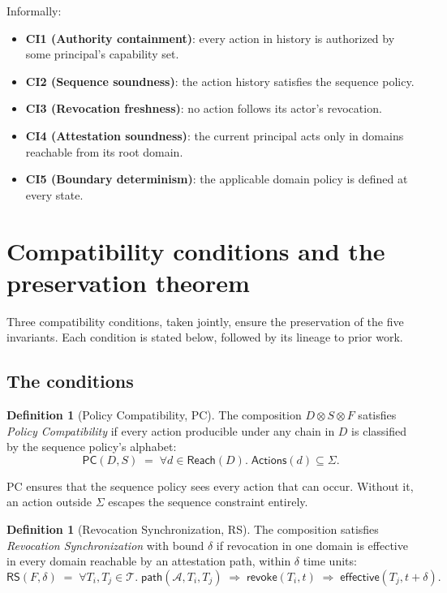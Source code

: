 \documentclass[11pt,a4paper]{article}
\theoremstyle{plain}
\theoremstyle{definition}
\newtheorem{definition}[theorem]{Definition}
\theoremstyle{remark}
\begin{document}
Informally:
\begin{itemize}
  \item \textbf{CI1 (Authority containment)}: every action in history is
  authorized by some principal's capability set.
  \item \textbf{CI2 (Sequence soundness)}: the action history satisfies the
  sequence policy.
  \item \textbf{CI3 (Revocation freshness)}: no action follows its actor's
  revocation.
  \item \textbf{CI4 (Attestation soundness)}: the current principal acts only
  in domains reachable from its root domain.
  \item \textbf{CI5 (Boundary determinism)}: the applicable domain policy is
  defined at every state.
\end{itemize}

\section{Compatibility conditions and the preservation theorem}
\label{sec:conditions}

Three compatibility conditions, taken jointly, ensure the preservation of the
five invariants. Each condition is stated below, followed by its lineage to
prior work.

\subsection{The conditions}

\begin{definition}[Policy Compatibility, PC]
\label{def:pc}
The composition $D \otimes S \otimes F$ satisfies \emph{Policy Compatibility}
if every action producible under any chain in $D$ is classified by the
sequence policy's alphabet:
\begin{equation*}
\mathsf{PC}(D, S) \;=\; \forall d \in \mathsf{Reach}(D).\; \mathsf{Actions}(d) \subseteq \Sigma.
\end{equation*}
\end{definition}

PC ensures that the sequence policy sees every action that can occur. Without
it, an action outside $\Sigma$ escapes the sequence constraint entirely.

\begin{definition}[Revocation Synchronization, RS]
\label{def:rs}
The composition satisfies \emph{Revocation Synchronization} with bound
$\delta$ if revocation in one domain is effective in every domain reachable by
an attestation path, within $\delta$ time units:
\begin{equation*}
\mathsf{RS}(F, \delta) \;=\; \forall T_i, T_j \in \mathcal{T}.\;
\mathsf{path}(\mathcal{A}, T_i, T_j) \;\Rightarrow\;
\mathsf{revoke}(T_i, t) \;\Rightarrow\; \mathsf{effective}(T_j, t + \delta).
\end{equation*}
\end{definition}
\end{document}

